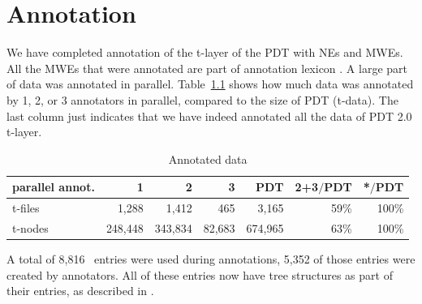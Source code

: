
\chapter{Annotation}
\label{sec:annot}

%
We have completed annotation of the t-layer of the PDT with NEs and MWEs. All the MWEs that were annotated are part of annotation lexicon \semlex. A large part of data was annotated in parallel. Table~\ref{tab:parallel-anot} shows how much data was annotated by 1, 2, or 3 annotators in parallel, compared to the size of PDT (t-data). The last column just indicates that we have indeed annotated all the data of PDT 2.0 t-layer.
\label{tab:parallel-anot}

\begin{table}[htdp]
\begin{tabular}{l|r|r|r|r|r|r}
 parallel annot.  & 1    & 2    & 3   & PDT    & 2+3$/$PDT & *$/$PDT \\
 \hline
 t-files & 1,288   & 1,412   & 465   & 3,165   & 59\%        & 100\% \\
 t-nodes & 248,448 & 343,834 & 82,683 & 674,965 & 63\%        & 100\% \\
\end{tabular}
\caption{Annotated data}
\label{tab:parallel-anot}
\end{table}%

A total of 8,816 \semlex\ entries were used during annotations, 5,352 of those entries were created by annotators. All of these entries now have tree structures as part of their entries, as described in .

